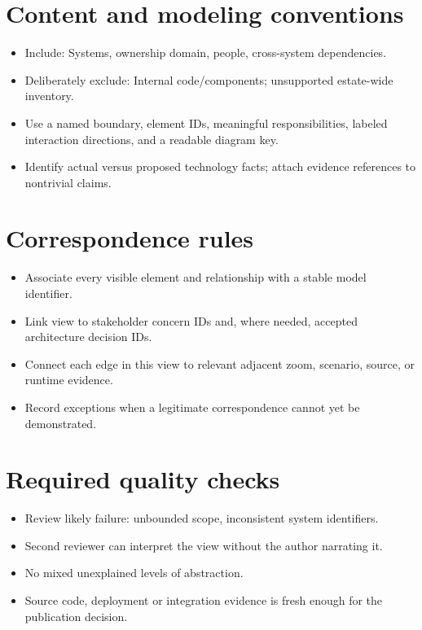 \documentclass[10pt,letterpaper]{article}
\begin{document}
\section{Content and modeling conventions}
\begin{itemize}
\item Include: Systems, ownership domain, people, cross-system dependencies.
\item Deliberately exclude: Internal code/components; unsupported estate-wide inventory.
\item Use a named boundary, element IDs, meaningful responsibilities, labeled interaction directions, and a readable diagram key.
\item Identify actual versus proposed technology facts; attach evidence references to nontrivial claims.
\end{itemize}

\section{Correspondence rules}
\begin{itemize}
\item Associate every visible element and relationship with a stable model identifier.
\item Link view to stakeholder concern IDs and, where needed, accepted architecture decision IDs.
\item Connect each edge in this view to relevant adjacent zoom, scenario, source, or runtime evidence.
\item Record exceptions when a legitimate correspondence cannot yet be demonstrated.
\end{itemize}

\section{Required quality checks}
\begin{itemize}
\item Review likely failure: unbounded scope, inconsistent system identifiers.
\item Second reviewer can interpret the view without the author narrating it.
\item No mixed unexplained levels of abstraction.
\item Source code, deployment or integration evidence is fresh enough for the publication decision.
\end{itemize}
\end{document}
